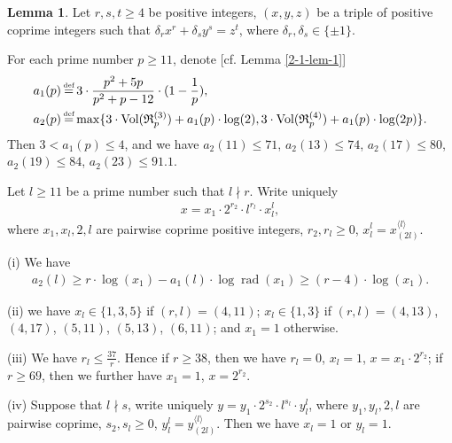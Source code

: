 \documentclass[a4paper, 12pt]{article}
\DeclareMathOperator{\defeq}{\overset{\text{\tiny{def}}}{=}}
\DeclareMathOperator{\rad}{\text{rad}}
\DeclareMathOperator{\Vol}{\text{Vol}}
\newcommand{\lagl}{\langle l \rangle}
\numberwithin{equation}{section}
\theoremstyle{definition}
\newtheorem{lem}[thm]{Lemma}
\begin{document}
\begin{lem}  \label{2-2-lem-1}
Let $r,s,t \ge 4$ be positive integers, $(x,y,z)$ be a triple of positive coprime integers such that $\delta_r x^r + \delta_s y^s =  z^t$, where $\delta_r,\delta_s \in \{\pm 1\}$.

For each prime number $p\ge 11$, denote [cf. Lemma \ref{2-1-lem-1}]
\small\begin{align*}
a_1(p) &\defeq 3 \cdot \frac{p^2+5p}{p^2+p-12}\cdot (1-\frac{1}{p}),  \\
a_2(p) &\defeq \max\{3 \cdot \Vol(\mathfrak R_p^{(3)})  + a_1(p)\cdot \log(2), 3 \cdot \Vol(\mathfrak R_p^{(4)}) + a_1(p)\cdot \log(2p) \} .
\end{align*}\normalsize
Then $3 < a_1(p) \le 4$, and we have $a_2(11) \le 71$, $a_2(13) \le 74$, $a_2(17) \le 80$, $a_2(19) \le 84$, $a_2(23) \le 91.1$.

Let $l\ge 11$ be a prime number such that $l\nmid r$.
Write uniquely \small\begin{gather}  \label{2-2-eq1}
x = x_1 \cdot 2^{r_2} \cdot l^{r_l} \cdot x_l^{l},
\end{gather}\normalsize
where $x_1, x_l, 2, l$ are pairwise coprime positive integers, $r_2, r_l \ge 0$, $x_l^l = x_{(2l)}^{\lagl}$.

(i) We have 
\small\begin{align}  \label{2-2-eq2}
a_2(l) \ge r \cdot \log(x_1) - a_1(l) \cdot \log\rad(x_1) \ge  (r - 4) \cdot \log(x_1).
\end{align}\normalsize

(ii) we have $x_l \in \{1,3,5\}$ if $(r,l) = (4,11)$;
$x_l \in \{1,3\}$ if $(r,l) = (4,13)$, $(4,17)$, $(5,11)$, $(5,13)$, $(6,11)$; 
and $x_1 = 1$ otherwise.

(iii) We have $r_l \le \frac{37}{r}$. Hence if $r\ge 38$, then we have $r_l = 0$, $x_l = 1$, $x = x_1 \cdot 2^{r_2}$; if $r\ge 69$, then we further have $x_1 = 1$, $x = 2^{r_2}$.

(iv) Suppose that $l\nmid s$, write uniquely $y = y_1 \cdot 2^{s_2} \cdot l^{s_l} \cdot y_l^{l}$, where $y_1, y_l, 2, l$ are pairwise coprime, $s_2, s_l \ge 0$, $y_l^l = y_{(2l)}^{\lagl}$. Then we have $x_l = 1$ or $y_l = 1$.
\end{lem}
\end{document}
